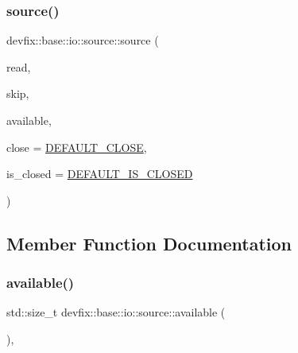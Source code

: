 \subsubsection{\texorpdfstring{source()}{source()}}
{\footnotesize\ttfamily devfix\+::base\+::io\+::source\+::source (\begin{DoxyParamCaption}\item[{\hyperlink{namespacedevfix_1_1base_1_1io_afa65222ee5a1636be18df5e16bbcf858}{read\+\_\+t}}]{read,  }\item[{\hyperlink{namespacedevfix_1_1base_1_1io_aeb8f94d85cfeaa405f53a6967e609645}{skip\+\_\+t}}]{skip,  }\item[{\hyperlink{namespacedevfix_1_1base_1_1io_a19c1195ab6a44e6d4f48b86062860a11}{available\+\_\+t}}]{available,  }\item[{\hyperlink{namespacedevfix_1_1base_1_1io_ae3118387742e5f4d484a328a213d6a5d}{close\+\_\+t}}]{close = {\ttfamily \hyperlink{namespacedevfix_1_1base_1_1io_a14a286c17d4b93881d42b1d14beb2d0b}{D\+E\+F\+A\+U\+L\+T\+\_\+\+C\+L\+O\+SE}},  }\item[{\hyperlink{namespacedevfix_1_1base_1_1io_a14f89d4437ced6ede49c044ee8e71f17}{is\+\_\+closed\+\_\+t}}]{is\+\_\+closed = {\ttfamily \hyperlink{namespacedevfix_1_1base_1_1io_ae04fec2a2a2db3482e624a59e59a2a14}{D\+E\+F\+A\+U\+L\+T\+\_\+\+I\+S\+\_\+\+C\+L\+O\+S\+ED}} }\end{DoxyParamCaption})}



\subsection{Member Function Documentation}
\mbox{\label{structdevfix_1_1base_1_1io_1_1source_a911f4ba79499a623de30cf16d3d26d47}} 
\subsubsection{\texorpdfstring{available()}{available()}}
{\footnotesize\ttfamily std\+::size\+\_\+t devfix\+::base\+::io\+::source\+::available (\begin{DoxyParamCaption}{ }\end{DoxyParamCaption})\hspace{0.3cm}{\ttfamily [override]}, {\ttfamily [virtual]}}



